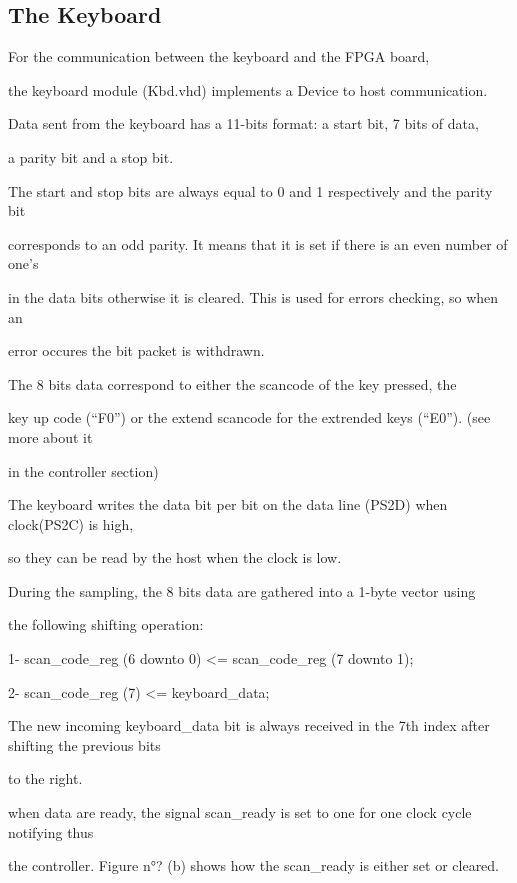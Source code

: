 \documentclass[conference]{IEEEtran}
\begin{document}
\subsection{The Keyboard}
For the communication between the keyboard and the FPGA board,

the keyboard module (Kbd.vhd) implements a Device to host communication.

Data sent from the keyboard has a 11-bits format: a start bit, 7 bits of data,

a parity bit and a stop bit.



The start and stop bits are always equal to 0 and 1 respectively and the parity bit

corresponds to an odd parity. It means that it is set if there is an even number of one's

in the data bits otherwise it is cleared. This is used for errors checking, so when an

error occures the bit packet is withdrawn.



The 8 bits data correspond to either the scancode of the key pressed, the

key up code (``F0'') or the extend scancode for the extrended keys (``E0''). (see more about it

in the controller section)



The keyboard writes the data bit per bit on the data line (PS2D) when clock(PS2C) is high,

so they can be read by the host when the clock is low.


During the sampling, the 8 bits data are gathered into a 1-byte vector using

the following shifting operation:



1-  scan_code_reg (6 downto 0) <= scan_code_reg (7 downto 1);

2-  scan_code_reg (7)          <= keyboard_data;



The new incoming keyboard_data bit is always received in the 7th index after shifting the previous bits

to the right.



when data are ready, the signal scan_ready is set to one for one clock cycle notifying thus

the controller. Figure n°? (b) shows how the scan_ready is either set or cleared.
\end{document}
